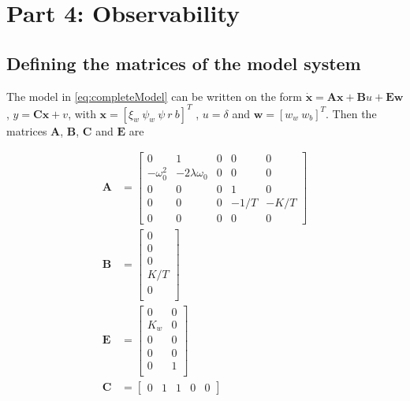 
\section{Part 4: Observability}

\subsection{Defining the matrices of the model system} \label{subsec:4a}

The model in \cref{eq:completeModel} can be written on the form $\mathbf{\dot x} = \mathbf{A} \mathbf{x} + \mathbf{B}u + \mathbf{E}\mathbf{w}$, $ y = \mathbf{C}\mathbf{x} + v$, with $\mathbf{x} = [ \xi_w\ \psi_w\ \psi\ r\ b]^ T $ , $ u = \delta $ and $ \mathbf{w} = [w_w\ w_b]^T$. Then the matrices $\mathbf{A}$, $\mathbf{B}$, $\mathbf{C}$ and $\mathbf{E}$ are

\begin{subequations}
    \begin{align}
        \mathbf{A} &= \begin{bmatrix}
        0 & 1 & 0 & 0 & 0 \\
        -\omega_0^2 & -2\lambda\omega_0 & 0 & 0 & 0 \\
        0 & 0 & 0 & 1 & 0 \\
        0 & 0 & 0 & -1/T & -K/T \\
        0 & 0 & 0 & 0 & 0
        \end{bmatrix} \\
        \mathbf{B} &= \begin{bmatrix}
        0 \\
        0 \\
        0 \\
        K/T \\
        0 \\
        \end{bmatrix} \\
        \mathbf{E} &= \begin{bmatrix}
        0 & 0 \\
        K_w & 0 \\
        0 & 0 \\
        0 & 0 \\
        0 & 1 \\
        \end{bmatrix} \\
        \mathbf{C} &= \begin{bmatrix}
        0 & 1 & 1 & 0 & 0
        \end{bmatrix}
    \end{align}
\end{subequations}

